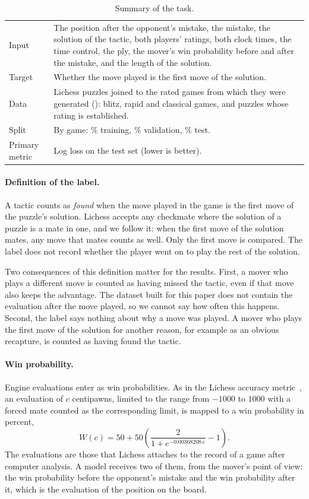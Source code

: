 \documentclass[11pt]{article}
\begin{document}
\begin{table}[htbp]\centering\small
\begin{tabularx}{\textwidth}{lL}
\toprule
Input & The position after the opponent's mistake, the mistake, the solution
of the tactic, both players' ratings, both clock times, the time control, the
ply, the mover's win probability before and after the mistake, and the
length of the solution. \\
Target & Whether the move played is the first move of the solution. \\
Data & Lichess puzzles joined to the rated games from which they were
generated (): blitz, rapid and classical games, and puzzles
whose rating is established. \\
Split & By game: \% training, \%
validation, \% test. \\
Primary metric & Log loss on the test set (lower is better). \\
\bottomrule
\end{tabularx}
\caption{Summary of the task.}
\label{tab:brief}
\end{table}

\paragraph{Definition of the label.}
A tactic counts as \emph{found} when the move played in the game is the first
move of the puzzle's solution. Lichess accepts any checkmate where the
solution of a puzzle is a mate in one, and we follow it: when the first move
of the solution mates, any move that mates counts as well. Only the first
move is compared. The label does not record whether the player went on to
play the rest of the solution.

Two consequences of this definition matter for the results. First, a mover
who plays a different move is counted as having missed the tactic, even if
that move also keeps the advantage. The dataset built for this paper does not
contain the evaluation after the move played, so we cannot say how often this
happens. Second, the label says nothing about why a move was played. A mover
who plays the first move of the solution for another reason, for example as
an obvious recapture, is counted as having found the tactic.

\paragraph{Win probability.}
Engine evaluations enter as win probabilities. As in the Lichess accuracy
metric~\cite{lichessaccuracy}, an evaluation of $c$ centipawns, limited to
the range from $-1000$ to $1000$ with a forced mate counted as the
corresponding limit, is mapped to a win probability in percent,
\[
W(c) = 50 + 50\left(\frac{2}{1 + e^{-0.00368208\,c}} - 1\right).
\]
The evaluations are those that Lichess attaches to the record of a game after
computer analysis. A model receives two of them, from the mover's point of
view: the win probability before the opponent's mistake and the win
probability after it, which is the evaluation of the position on the board.
\end{document}
